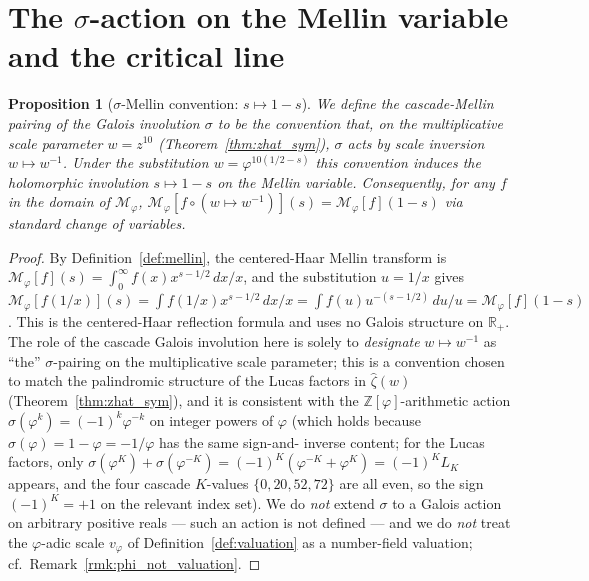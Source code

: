 \documentclass[11pt, a4paper]{amsart}
\newtheorem{proposition}[theorem]{Proposition}
\theoremstyle{definition}
\newcommand{\R}{\mathbb{R}}
\newcommand{\Z}{\mathbb{Z}}
\newcommand{\pphi}{\varphi}
\begin{document}
\section{The $\sigma$-action on the Mellin variable and the critical line}\label{sec:mellinline}

\begin{proposition}[$\sigma$-Mellin convention: $s \mapsto 1-s$]\label{prop:sigmas}
We \emph{define} the cascade-Mellin pairing of the Galois involution
$\sigma$ to be the convention that, on the multiplicative scale
parameter $w = z^{10}$ (Theorem~\ref{thm:zhat_sym}), $\sigma$ acts
by scale inversion $w \mapsto w^{-1}$.  Under the substitution
$w = \varphi^{10(1/2-s)}$ this convention induces the holomorphic
involution $s \mapsto 1-s$ on the Mellin variable.  Consequently,
for any $f$ in the domain of $\mathcal{M}_\pphi$,
$\mathcal{M}_\pphi[f \circ (w \mapsto w^{-1})](s) =
\mathcal{M}_\pphi[f](1-s)$ via standard change of variables.
\end{proposition}

\begin{proof}
By Definition~\ref{def:mellin}, the centered-Haar Mellin
transform is $\mathcal{M}_\pphi[f](s) = \int_0^\infty f(x)
x^{s-1/2}\, dx/x$, and the substitution $u = 1/x$ gives
$\mathcal{M}_\pphi[f(1/x)](s) = \int f(1/x) x^{s-1/2}\, dx/x
= \int f(u) u^{-(s-1/2)}\, du/u = \mathcal{M}_\pphi[f](1-s)$.
This is the centered-Haar reflection formula and uses no Galois
structure on $\R_+$.  The role of the cascade Galois involution
here is solely to \emph{designate} $w \mapsto w^{-1}$ as ``the''
$\sigma$-pairing on the multiplicative scale parameter; this is a
convention chosen to match the palindromic structure of the
Lucas factors in $\widehat\zeta(w)$
(Theorem~\ref{thm:zhat_sym}), and it is consistent with the
$\Z[\pphi]$-arithmetic action $\sigma(\varphi^k) = (-1)^k\varphi^{-k}$
on integer powers of $\varphi$ (which holds because
$\sigma(\varphi) = 1 - \varphi = -1/\varphi$ has the same sign-and-
inverse content; for the Lucas factors, only $\sigma(\varphi^K) +
\sigma(\varphi^{-K}) = (-1)^K(\varphi^{-K} + \varphi^{K}) = (-1)^K L_K$
appears, and the four cascade $K$-values
$\{0,20,52,72\}$ are all even, so the sign $(-1)^K = +1$ on the
relevant index set).
We do \emph{not} extend $\sigma$ to a Galois action on arbitrary
positive reals --- such an action is not defined --- and we do
\emph{not} treat the $\pphi$-adic scale $v_\pphi$ of
Definition~\ref{def:valuation} as a number-field valuation; cf.\
Remark~\ref{rmk:phi_not_valuation}.
\end{proof}
\end{document}
